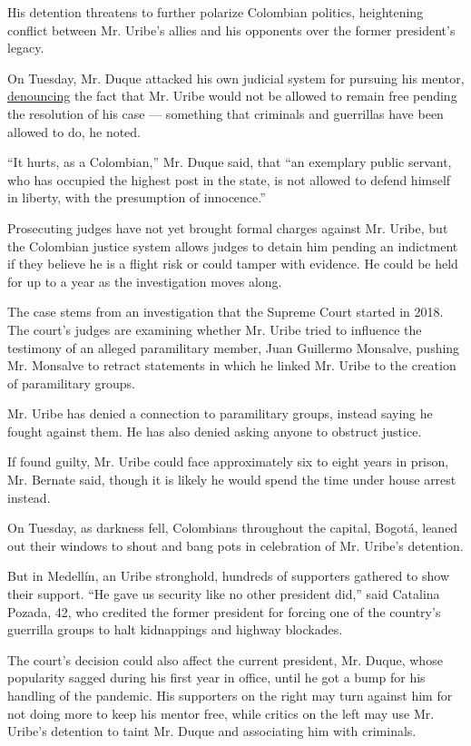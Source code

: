 His detention threatens to further polarize Colombian politics,
heightening conflict between Mr. Uribe's allies and his opponents over
the former president's legacy.

On Tuesday, Mr. Duque attacked his own judicial system for pursuing his
mentor,
\href{https://twitter.com/IvanDuque/status/1290755832330813442}{denouncing}
the fact that Mr. Uribe would not be allowed to remain free pending the
resolution of his case --- something that criminals and guerrillas have
been allowed to do, he noted.

``It hurts, as a Colombian,'' Mr. Duque said, that ``an exemplary public
servant, who has occupied the highest post in the state, is not allowed
to defend himself in liberty, with the presumption of innocence.''

Prosecuting judges have not yet brought formal charges against Mr.
Uribe, but the Colombian justice system allows judges to detain him
pending an indictment if they believe he is a flight risk or could
tamper with evidence. He could be held for up to a year as the
investigation moves along.

The case stems from an investigation that the Supreme Court started in
2018. The court's judges are examining whether Mr. Uribe tried to
influence the testimony of an alleged paramilitary member, Juan
Guillermo Monsalve, pushing Mr. Monsalve to retract statements in which
he linked Mr. Uribe to the creation of paramilitary groups.

Mr. Uribe has denied a connection to paramilitary groups, instead saying
he fought against them. He has also denied asking anyone to obstruct
justice.

If found guilty, Mr. Uribe could face approximately six to eight years
in prison, Mr. Bernate said, though it is likely he would spend the time
under house arrest instead.

On Tuesday, as darkness fell, Colombians throughout the capital, Bogotá,
leaned out their windows to shout and bang pots in celebration of Mr.
Uribe's detention.

But in Medellín, an Uribe stronghold, hundreds of supporters gathered to
show their support. ``He gave us security like no other president did,''
said Catalina Pozada, 42, who credited the former president for forcing
one of the country's guerrilla groups to halt kidnappings and highway
blockades.

The court's decision could also affect the current president, Mr. Duque,
whose popularity sagged during his first year in office, until he got a
bump for his handling of the pandemic. His supporters on the right may
turn against him for not doing more to keep his mentor free, while
critics on the left may use Mr. Uribe's detention to taint Mr. Duque and
associating him with criminals.


